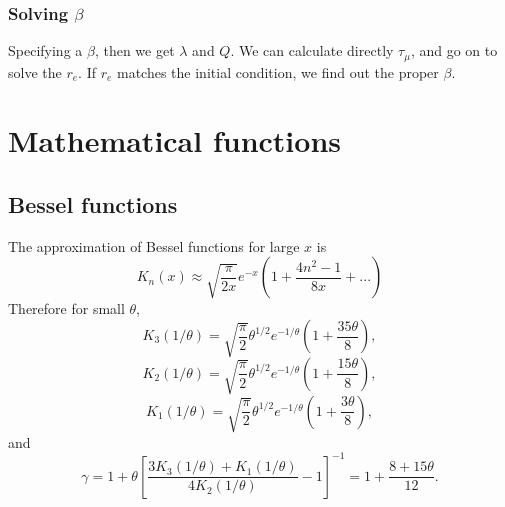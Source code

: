 \documentclass[12pt]{book}
\begin{document}
\subsection{Solving $\beta$}
Specifying a $\beta$, then we get $\lambda$ and $Q$. We can calculate directly $\tau_\mu$, and go on to solve the $r_e$. If $r_e$ matches the initial condition, we find out the proper $\beta$. 
\chapter{Mathematical functions }
\section{Bessel functions}
The approximation of Bessel functions for large $x$ is
\begin{equation}
 K_{n}(x)\approx\sqrt{\frac{\pi}{2x}}e^{-x}\left(1+\frac{4n^2-1}{8x}+...\right)
\end{equation}
Therefore for small $\theta$,
\begin{equation}
K_3(1/\theta)=\sqrt{\frac{\pi}{2}}\theta^{1/2}e^{-1/\theta}\left(1+\frac{35\theta}{8}\right),
\end{equation}
\begin{equation}
K_2(1/\theta)=\sqrt{\frac{\pi}{2}}\theta^{1/2}e^{-1/\theta}\left(1+\frac{15\theta}{8}\right),
\end{equation}
\begin{equation}
K_1(1/\theta)=\sqrt{\frac{\pi}{2}}\theta^{1/2}e^{-1/\theta}\left(1+\frac{3\theta}{8}\right),
\end{equation}
and
\begin{equation}
\gamma=1+\theta\left[\frac{3K_3(1/\theta)+K_1(1/\theta)}{4K_2(1/\theta)}-1\right]^{-1}=1+\frac{8+15\theta}{12}.
\end{equation}
\end{document}
